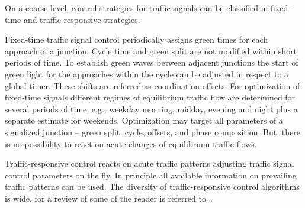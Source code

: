 On a coarse level, control strategies for traffic signals can be classified in fixed-time and traffic-responsive strategies. 

Fixed-time traffic signal control periodically assigns green times for each approach of a junction. 
Cycle time and green split are not modified within short periods of time. 
To establish green waves between adjacent junctions the start of green light for the approaches within the cycle can be adjusted in respect to a global timer. 
These shifts are referred as coordination offsets. 
For optimization of fixed-time signals different regimes of equilibrium traffic flow are determined for several periods of time, e.g., weekday morning, midday, evening and night plus a separate estimate for weekends.   
Optimization may target all parameters of a signalized junction -- green split, cycle, offsets, and phase composition. 
But, there is no possibility to react on acute changes of equilibrium traffic flows. 

Traffic-responsive control reacts on acute traffic patterns adjusting traffic signal control parameters on the fly. 
In principle all available information on prevailing traffic patterns can be used. 
The diversity of traffic-responsive control algorithms is wide, for a review of some of the reader is referred to~\citet[][]{Grether2014PhD}. 

